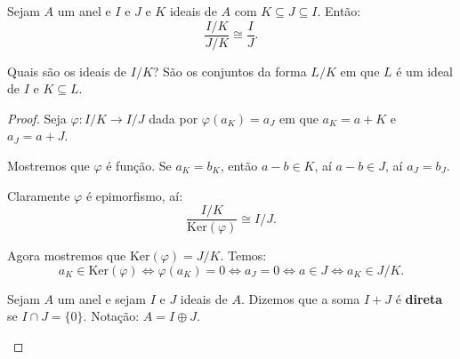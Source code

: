 \documentclass[11pt,twoside,a4paper]{book}
\begin{document}
\begin{corolario}
Sejam $A$ um anel e $I$ e $J$ e $K$ ideais de $A$ com $K\subseteq J\subseteq I$. Então:
\[
\frac{I/K}{J/K}\cong\frac{I}{J}.
\]
\end{corolario}

\begin{observacao}
Quais são os ideais de $I/K$? São os conjuntos da forma $L/K$ em que $L$ é um ideal de $I$ e $K\subseteq L$.
\end{observacao}

\begin{proof}
Seja $\varphi:I/K\rightarrow I/J$ dada por $\varphi(a_K)=a_J$ em que $a_K=a+K$ e $a_J=a+J$.

\medskip
\noindent
Mostremos que $\varphi$ é função. Se $a_K=b_K$, então $a-b\in K$, aí $a-b\in J$, aí $a_J=b_J$.

\medskip
\noindent
Claramente $\varphi$ é epimorfismo, aí:
\[
\frac{I/K}{\mathrm{Ker}(\varphi)}\cong I/J.
\]

\noindent
Agora mostremos que $\mathrm{Ker}(\varphi)=J/K$. Temos:
\[
a_K\in\mathrm{Ker}(\varphi)\Leftrightarrow \varphi(a_K)=0\Leftrightarrow a_J=0\Leftrightarrow a\in J\Leftrightarrow a_K\in J/K.
\]

\begin{definicao}
Sejam $A$ um anel e sejam $I$ e $J$ ideais de $A$. Dizemos que a soma $I+J$ é \textbf{direta} se $I\cap J=\{0\}$. Notação: $A=I\oplus J$.
\end{definicao}

\begin{definicao}

\end{definicao}

\end{proof}

\printindex
\end{document}
